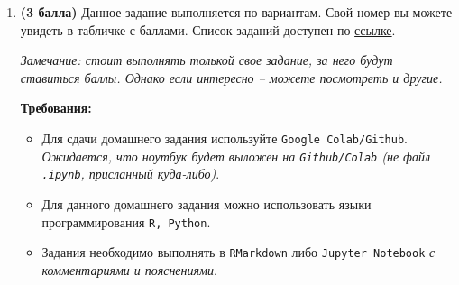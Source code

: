 \documentclass{assignment}
\begin{document}
\begin{enumerate}
    \item \textbf{(3 балла)} Данное задание выполняется по вариантам. Свой номер вы можете увидеть в табличке с баллами. Список заданий доступен по \href{https://drive.google.com/file/d/1AUE3md4TKo0PjZY9W2LFU3uLOUjxeQqI}{ссылке}.

    \textit{Замечание: стоит выполнять толькой свое задание, за него будут ставиться баллы. Однако если интересно – можете посмотреть и другие.}

    \textbf{Требования:}
    \begin{itemize}
        \item Для сдачи домашнего задания используйте \texttt{Google Colab/Github}. \textit{Ожидается, что ноутбук будет выложен на \texttt{Github/Colab} (не файл \texttt{.ipynb}, присланный куда-либо)}.
         \item Для данного домашнего задания можно использовать языки программирования \texttt{R, Python}.
         \item Задания необходимо выполнять в \texttt{RMarkdown} либо \texttt{Jupyter Notebook} \textit{с комментариями и пояснениями}.
    \end{itemize}
\end{enumerate}
\end{document}

